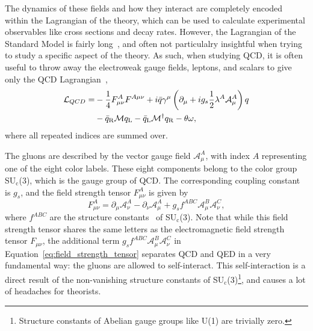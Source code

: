 The dynamics of these fields and how they interact are completely encoded within the Lagrangian of the theory, which can be used to calculate experimental observables like cross sections and decay rates. However, the Lagrangian of the Standard Model is fairly long~\cite{StandardModelLength1}, and often not particulalry insightful when trying to study a specific aspect of the theory. As such, when studying QCD, it is often useful to throw away the electroweak gauge fields, leptons, and scalars to give only the QCD Lagrangian~\cite{QCDHistory},
%
\begin{align*}
    \label{eq:qcd_lagrangian}
    \mathcal{L}_{Q C D}= & -\frac{1}{4} F_{\mu \nu}^A F^{A \space \mu \nu}+i \bar{q} \gamma^\mu\left(\partial_\mu+i g_s \frac{1}{2} \lambda^A \mathcal{A}_\mu^A\right) q \\
    & -\bar{q}_{\mathrm{R}} \mathcal{M} q_{\mathrm{L}}-\bar{q}_{\mathrm{L}} \mathcal{M}^{\dagger} q_{\mathrm{R}}-\theta \omega,
\end{align*}
%
where all repeated indices are summed over.

The gluons are described by the vector gauge field $\mathcal{A}_\mu^A$, with index $A$ representing one of the eight color labels. These eight components belong to the color group SU$_\text{c}$(3), which is the gauge group of QCD. The corresponding coupling constant is $g_{s}$, and the field strength tensor $F_{\mu \nu}^A$ is given by
%
\begin{equation}
    \label{eq:field_strength_tensor}
    F_{\mu \nu}^A = \partial_\mu \mathcal{A}_\nu^A - \partial_\nu \mathcal{A}_\mu^A + g_s f^{ABC} \mathcal{A}_\mu^B \mathcal{A}_\nu^C,
\end{equation}
%
where $f^{ABC}$ are the structure constants~\cite{StructureConstants} of SU$_\text{c}$(3). Note that while this field strength tensor shares the same letters as the electromagnetic field strength tensor $F_{\mu \nu}$, the additional term $g_s f^{ABC} \mathcal{A}_\mu^B \mathcal{A}_\nu^C$ in Equation~\ref{eq:field_strength_tensor} separates QCD and QED in a very fundamental way: the gluons are allowed to self-interact. This self-interaction is a direct result of the non-vanishing structure constants of SU$_\text{c}$(3)\footnote{Structure constants of Abelian gauge groups like U(1) are trivially zero.}, and causes a lot of headaches for theorists.

